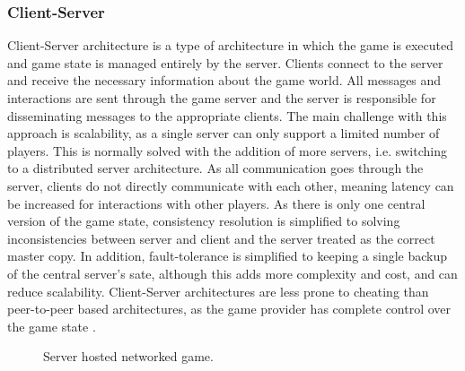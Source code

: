 \subsubsection{Client-Server}
Client-Server architecture is a type of architecture in which the game is executed and game state is managed entirely by the server. Clients connect to the server and receive the necessary information about the game world. All messages and interactions are sent through the game server and the server is responsible for disseminating messages to the appropriate clients. The main challenge with this approach is scalability, as a single server can only support a limited number of players. This is normally solved with the addition of more servers, i.e. switching to a distributed server architecture. As all communication goes through the server, clients do not directly communicate with each other, meaning latency can be increased for interactions with other players.
As there is only one central version of the game state, consistency resolution is simplified to solving inconsistencies between server and client and the server treated as the correct master copy. In addition, fault-tolerance is simplified to keeping a single backup of the central server's sate, although this adds more complexity and cost, and can reduce scalability. Client-Server architectures are less prone to cheating than peer-to-peer based architectures, as the game provider has complete control over the game state \cite{P2PSurvey}.

\begin{figure}
	\centering
	
	\caption{Server hosted networked game.}
\end{figure}

%
%	

